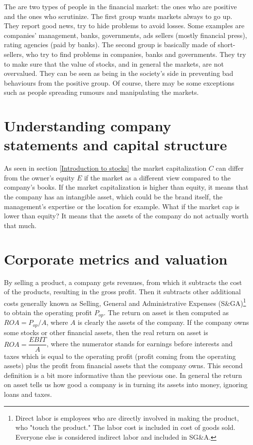 The are two types of people in the financial market: the ones who are positive and the ones who scrutinize. The first group wants markets always to go up. They report good news, try to hide problems to avoid losses. Some examples are companies' management, banks, governments, ads sellers (mostly financial press), rating agencies (paid by banks). The second group is basically made of short-sellers, who try to find problems in companies, banks and governments. They try to make sure that the value of stocks, and in general the markets, are not overvalued. They can be seen as being in the society's side in preventing bad behaviours from the positive group. Of course, there may be some exceptions such as people spreading rumours and manipulating the markets.

\section{Understanding company statements and capital structure}

As seen in section \ref{Introduction to stocks} the market capitalization $C$ can differ from the owner's equity $E$ if the market as a different view compared to the company's books. If the market capitalization is higher than equity, it means that the company has an intangible asset, which could be the brand itself, the management's expertise or the location for example. What if the market cap is lower than equity? It means that the assets of the company do not actually worth that much.

\section{Corporate metrics and valuation} \label{Corporate metrics and valuation}

By selling a product, a company gets revenues, from which it subtracts the cost of the products, resulting in the gross profit. Then it subtracts other additional costs generally known as Selling, General and Administrative Expenses (S\&GA)\footnote{Direct labor is employees who are directly involved in making the product, who "touch the product." The labor cost is included in cost of goods sold. Everyone else is considered indirect labor and included in SG\&A.} to obtain the operating profit $P_{op}$. The return on asset is then computed as $ROA = P_{op}/A$, where $A$ is clearly the assets of the company. If the company owns some stocks or other financial assets, then the real return on asset is $ROA = \dfrac{EBIT}{A}$, where the numerator stands for earnings before interests and taxes which is equal to the operating profit (profit coming from the operating assets) plus the profit from financial assets that the company owns. This second definition is a bit more informative than the previous one. In general the return on asset tells us how good a company is in turning its assets into money, ignoring loans and taxes.

